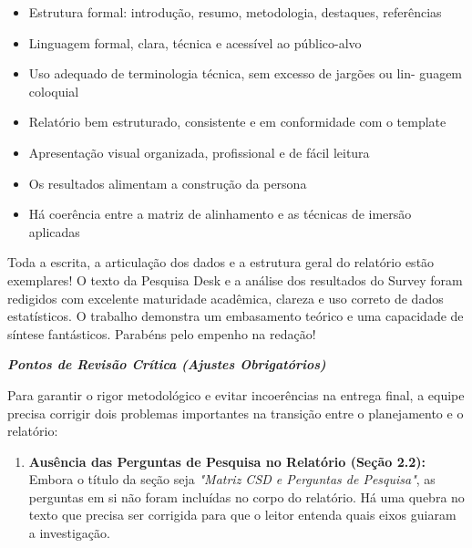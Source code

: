 \documentclass[
  sigconf,
  nonacm, %
  language=portuguese
]{acmart}
\begin{document}
\begin{itemize}[leftmargin=14pt,itemsep=1pt,topsep=3pt,parsep=0pt]
  \item[\textcolor{cgood}{$\checkmark$}] {\small\textcolor{cgood}{Estrutura formal: introdução, resumo, metodologia, destaques, referências}}
  \item[\textcolor{cgood}{$\checkmark$}] {\small\textcolor{cgood}{Linguagem formal, clara, técnica e acessível ao público-alvo}}
  \item[\textcolor{cgood}{$\checkmark$}] {\small\textcolor{cgood}{Uso adequado de terminologia técnica, sem excesso de jargões ou lin- guagem coloquial}}
  \item[\textcolor{cgood}{$\checkmark$}] {\small\textcolor{cgood}{Relatório bem estruturado, consistente e em conformidade com o template}}
  \item[\textcolor{cgood}{$\checkmark$}] {\small\textcolor{cgood}{Apresentação visual organizada, profissional e de fácil leitura}}
  \item[\textcolor{cgood}{$\checkmark$}] {\small\textcolor{cgood}{Os resultados alimentam a construção da persona}}
  \item[$\square$] {\small\textcolor{cmuted}{Há coerência entre a matriz de alinhamento e as técnicas de imersão aplicadas}}
\end{itemize}

Toda a escrita, a articulação dos dados e a estrutura geral do relatório estão exemplares! O texto da Pesquisa Desk e a análise dos resultados do Survey foram redigidos com excelente maturidade acadêmica, clareza e uso correto de dados estatísticos. O trabalho demonstra um embasamento teórico e uma capacidade de síntese fantásticos. Parabéns pelo empenho na redação!

\textit{\textbf{\textbf{Pontos de Revisão Crítica (Ajustes Obrigatórios)}}}

Para garantir o rigor metodológico e evitar incoerências na entrega final, a equipe precisa corrigir dois problemas importantes na transição entre o planejamento e o relatório:

\begin{enumerate}[leftmargin=14pt,itemsep=2pt,topsep=4pt]
  \item \textbf{Ausência das Perguntas de Pesquisa no Relatório (Seção 2.2):} Embora o título da seção seja \textit{"Matriz CSD e Perguntas de Pesquisa"}, as perguntas em si não foram incluídas no corpo do relatório. Há uma quebra no texto que precisa ser corrigida para que o leitor entenda quais eixos guiaram a investigação.
\end{enumerate}
\end{document}
